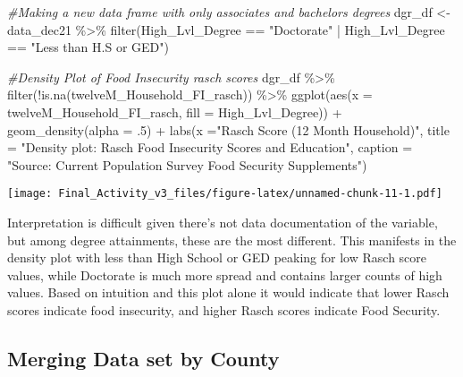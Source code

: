 \documentclass[
]{article}
\newenvironment{Shaded}{\begin{snugshade}}{\end{snugshade}}
\newcommand{\AttributeTok}[1]{\textcolor[rgb]{0.77,0.63,0.00}{#1}}
\newcommand{\CommentTok}[1]{\textcolor[rgb]{0.56,0.35,0.01}{\textit{#1}}}
\newcommand{\DecValTok}[1]{\textcolor[rgb]{0.00,0.00,0.81}{#1}}
\newcommand{\FunctionTok}[1]{\textcolor[rgb]{0.00,0.00,0.00}{#1}}
\newcommand{\NormalTok}[1]{#1}
\newcommand{\OtherTok}[1]{\textcolor[rgb]{0.56,0.35,0.01}{#1}}
\newcommand{\SpecialCharTok}[1]{\textcolor[rgb]{0.00,0.00,0.00}{#1}}
\newcommand{\StringTok}[1]{\textcolor[rgb]{0.31,0.60,0.02}{#1}}
\begin{document}
\begin{Shaded}
\begin{Highlighting}[]
\CommentTok{\#Making a new data frame with only associates and bachelor\textquotesingle{}s degrees}
\NormalTok{dgr\_df }\OtherTok{\textless{}{-}}\NormalTok{ data\_dec21 }\SpecialCharTok{\%\textgreater{}\%} \FunctionTok{filter}\NormalTok{(High\_Lvl\_Degree }\SpecialCharTok{==} \StringTok{"Doctorate"} \SpecialCharTok{|}\NormalTok{ High\_Lvl\_Degree }\SpecialCharTok{==} \StringTok{"Less than H.S or GED"}\NormalTok{)}

\CommentTok{\#Density Plot of Food Insecurity rasch scores}
\NormalTok{dgr\_df }\SpecialCharTok{\%\textgreater{}\%} \FunctionTok{filter}\NormalTok{(}\SpecialCharTok{!}\FunctionTok{is.na}\NormalTok{(twelveM\_Household\_FI\_rasch)) }\SpecialCharTok{\%\textgreater{}\%} 
  \FunctionTok{ggplot}\NormalTok{(}\FunctionTok{aes}\NormalTok{(}\AttributeTok{x =}\NormalTok{ twelveM\_Household\_FI\_rasch, }\AttributeTok{fill =}\NormalTok{ High\_Lvl\_Degree)) }\SpecialCharTok{+}
  \FunctionTok{geom\_density}\NormalTok{(}\AttributeTok{alpha =}\NormalTok{ .}\DecValTok{5}\NormalTok{) }\SpecialCharTok{+}
  \FunctionTok{labs}\NormalTok{(}\AttributeTok{x =}\StringTok{"Rasch Score (12 Month Household)"}\NormalTok{,}
       \AttributeTok{title =} \StringTok{"Density plot: Rasch Food Insecurity Scores and Education"}\NormalTok{,}
       \AttributeTok{caption =} \StringTok{"Source: Current Population Survey Food Security Supplements"}\NormalTok{)}
\end{Highlighting}
\end{Shaded}

\texttt{[image: Final\_Activity\_v3\_files/figure-latex/unnamed-chunk-11-1.pdf]}

Interpretation is difficult given there's not data documentation of the
variable, but among degree attainments, these are the most different.
This manifests in the density plot with less than High School or GED
peaking for low Rasch score values, while Doctorate is much more spread
and contains larger counts of high values. Based on intuition and this
plot alone it would indicate that lower Rasch scores indicate food
insecurity, and higher Rasch scores indicate Food Security.

\hypertarget{merging-data-set-by-county}{%
\subsection{Merging Data set by
County}\label{merging-data-set-by-county}}
\end{document}
